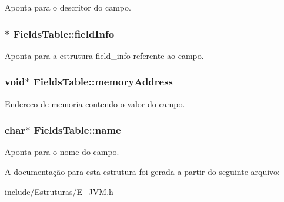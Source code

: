Aponta para o descritor do campo. 

\hypertarget{struct_fields_table_a0d8937ba1f6023433e234337d5825315}{}
\subsubsection[{field\+Info}]{$\ast$ Fields\+Table\+::field\+Info}\label{struct_fields_table_a0d8937ba1f6023433e234337d5825315}


Aponta para a estrutura field\+\_\+info referente ao campo. 

\hypertarget{struct_fields_table_a5c251342633df2e314a6b88c25f2a604}{}
\subsubsection[{memory\+Address}]{\setlength{\rightskip}{0pt plus 5cm}void$\ast$ Fields\+Table\+::memory\+Address}\label{struct_fields_table_a5c251342633df2e314a6b88c25f2a604}


Endereco de memoria contendo o valor do campo. 

\hypertarget{struct_fields_table_a931fde572e99face7e9cd2fbc29cd36e}{}
\subsubsection[{name}]{\setlength{\rightskip}{0pt plus 5cm}char$\ast$ Fields\+Table\+::name}\label{struct_fields_table_a931fde572e99face7e9cd2fbc29cd36e}


Aponta para o nome do campo. 



A documentação para esta estrutura foi gerada a partir do seguinte arquivo\+:\begin{DoxyCompactItemize}
\item 
include/\+Estruturas/\hyperlink{_e___j_v_m_8h}{E\+\_\+\+J\+V\+M.\+h}\end{DoxyCompactItemize}
